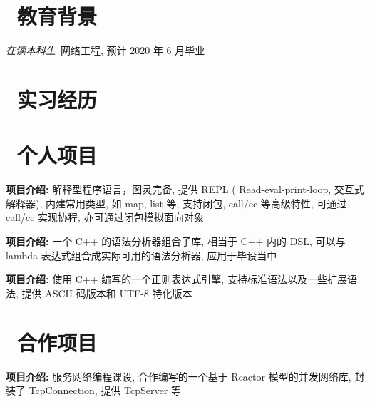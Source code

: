\documentclass{resume}
\begin{document}



\section{\faGraduationCap\  教育背景}
\textit{在读本科生}\ 网络工程, 预计 2020 年 6 月毕业

\section{\faUsers\ 实习经历}
\role{实习}{系统开发}

\section{\faGithubAlt\ 个人项目}
\begin{onehalfspacing}
\textbf{项目介绍: } 解释型程序语言，图灵完备, 提供 REPL ( Read-eval-print-loop, 交互式解释器), 内建常用类型, 如 map, list 等, 支持闭包, call/cc 等高级特性, 可通过 call/cc 实现协程, 亦可通过闭包模拟面向对象
\end{onehalfspacing}

\begin{onehalfspacing}
\textbf{项目介绍: } 一个 C++ 的语法分析器组合子库, 相当于 C++ 内的 DSL, 可以与 lambda 表达式组合成实际可用的语法分析器, 应用于毕设当中
\end{onehalfspacing}

\begin{onehalfspacing}
\textbf{项目介绍: } 使用 C++ 编写的一个正则表达式引擎, 支持标准语法以及一些扩展语法, 提供 ASCII 码版本和 UTF-8 特化版本
\end{onehalfspacing}

\section{\faObjectGroup\ 合作项目}
\begin{onehalfspacing}
\textbf{项目介绍: } 服务网络编程课设, 合作编写的一个基于 Reactor 模型的并发网络库, 封装了 TcpConnection, 提供 TcpServer 等
\end{onehalfspacing}
\end{document}
